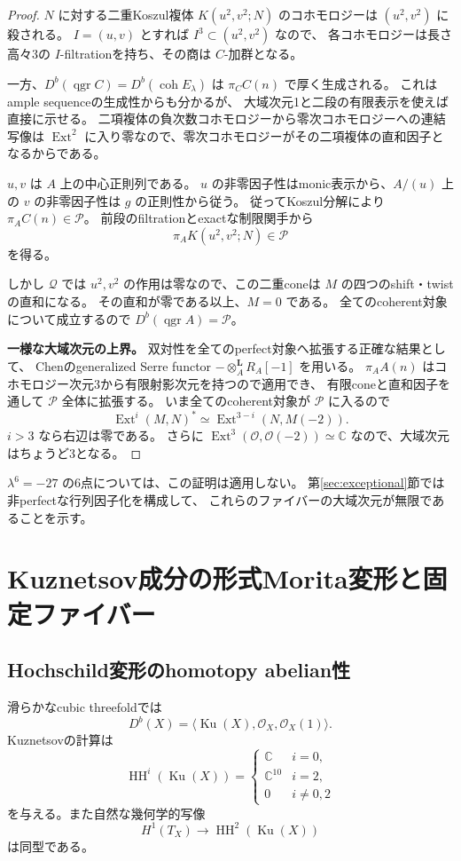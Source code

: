 \documentclass[a4paper,11pt]{ltjsarticle}
\theoremstyle{definition}
\newcommand{\CC}{\mathbb C}
\newcommand{\OO}{\mathcal O}
\newcommand{\Ku}{\operatorname{Ku}}
\newcommand{\HH}{\operatorname{HH}}
\newcommand{\Ext}{\operatorname{Ext}}
\newcommand{\qgr}{\operatorname{qgr}}
\begin{document}
\begin{proof}
$N$ に対する二重Koszul複体 $K(u^2,v^2;N)$ のコホモロジーは
$(u^2,v^2)$ に殺される。
$I=(u,v)$ とすれば $I^3\subset(u^2,v^2)$ なので、
各コホモロジーは長さ高々3の $I$-filtrationを持ち、その商は $C$-加群となる。

一方、$D^b(\qgr C)=D^b(\operatorname{coh}E_\lambda)$ は $\pi_CC(n)$ で厚く生成される。
これはample sequenceの生成性からも分かるが、
大域次元1と二段の有限表示を使えば直接に示せる。
二項複体の負次数コホモロジーから零次コホモロジーへの連結写像は
$\Ext^2$ に入り零なので、零次コホモロジーがその二項複体の直和因子となるからである。

$u,v$ は $A$ 上の中心正則列である。
$u$ の非零因子性はmonic表示から、$A/(u)$ 上の $v$ の非零因子性は $g$ の正則性から従う。
従ってKoszul分解により $\pi_A C(n)\in\mathcal P$。
前段のfiltrationとexactな制限関手から
\[
 \pi_AK(u^2,v^2;N)\in\mathcal P
\]
を得る。

しかし $\mathcal Q$ では $u^2,v^2$ の作用は零なので、この二重coneは
$M$ の四つのshift・twistの直和になる。
その直和が零である以上、$M=0$ である。
全てのcoherent対象について成立するので $D^b(\qgr A)=\mathcal P$。

\textbf{一様な大域次元の上界。}
双対性を全てのperfect対象へ拡張する正確な結果として、
Chen\cite[Theorem 3.10]{Chen}のgeneralized Serre functor
$-\otimes_A^{\mathbf L}R_A[-1]$ を用いる。
$\pi_A A(n)$ はコホモロジー次元3から有限射影次元を持つので適用でき、
有限coneと直和因子を通して $\mathcal P$ 全体に拡張する。
いま全てのcoherent対象が $\mathcal P$ に入るので
\[
 \Ext^i(M,N)^*\simeq\Ext^{3-i}(N,M(-2)).
\]
$i>3$ なら右辺は零である。
さらに $\Ext^3(\OO,\OO(-2))\simeq\CC$ なので、大域次元はちょうど3となる。
\end{proof}

$\lambda^6=-27$ の6点については、この証明は適用しない。
第\ref{sec:exceptional}節では非perfectな行列因子化を構成して、
これらのファイバーの大域次元が無限であることを示す。

\section{Kuznetsov成分の形式Morita変形と固定ファイバー}

\subsection{Hochschild変形のhomotopy abelian性}

滑らかなcubic threefoldでは
\[
 D^b(X)=\langle\Ku(X),\OO_X,\OO_X(1)\rangle.
\]
Kuznetsovの計算\cite[Theorem 8.9]{Kuz}は
\[
 \HH^i(\Ku(X))=
 \begin{cases}
 \CC&i=0,\\
 \CC^{10}&i=2,\\
 0&i\ne0,2
 \end{cases}
\]
を与える。また自然な幾何学的写像
\[
 H^1(T_X)\longrightarrow\HH^2(\Ku(X))
\]
は同型である\cite[Theorem 4.4(2)]{JLLZ}。
\end{document}
